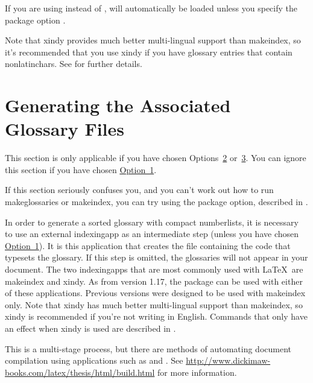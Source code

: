 \documentclass[report,inlinetitle]{nlctdoc}
\newcommand*{\opt}[1]{\hyperlink{option#1}{Option~#1}}
\newcommand*{\optsor}[2]{Options~\hyperlink{option#1}{#1}
or~\hyperlink{option#2}{#2}}
\begin{document}
If you are using  instead of , 
 will automatically be loaded unless
you specify the package option .

Note that \gls{xindy} provides much better multi-lingual support
than \gls{makeindex}, so it's recommended that you use \gls*{xindy}
if you have glossary entries that contain 
\glspl{nonlatinchar}. See  for further
details.

\section{Generating the Associated Glossary Files}
\label{sec:makeglossaries}

\begin{important}
This section is only applicable if you have chosen \optsor23. You can
ignore this section if you have chosen \opt1.
\end{important}

If this section seriously confuses you, and you can't work out how
to run \gls{makeglossaries} or \gls{makeindex}, you can try using
the  package option, described in 
.

In order to generate a sorted glossary with compact
\glspl{numberlist}, it is necessary to use an external
\gls{indexingapp} as an intermediate step (unless you have chosen
\opt1). It is this application that creates the file containing the
code that typesets the glossary. If this step is omitted, the
glossaries will not appear in your document. The two
\glspl*{indexingapp} that are most commonly used with \LaTeX\ are
\gls{makeindex} and \gls{xindy}. As from version 1.17, the
 package can be used with either of these
applications. Previous versions were designed to be used with
\gls*{makeindex} only. Note that \gls*{xindy} has much better
multi-lingual support than \gls*{makeindex}, so \gls*{xindy} is
recommended if you're not writing in English. Commands that only
have an effect when \gls*{xindy} is used are described in
.

\begin{important}
This is a multi-stage process, but there are methods of automating
document compilation using applications such as  and
. See
\url{http://www.dickimaw-books.com/latex/thesis/html/build.html} for
more information.
\end{important}
\end{document}
